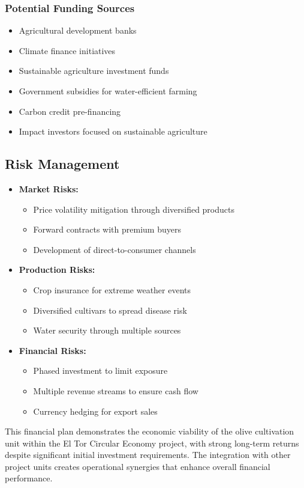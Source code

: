 \subsubsection{Potential Funding Sources}
\begin{itemize}
    \item Agricultural development banks
    \item Climate finance initiatives
    \item Sustainable agriculture investment funds
    \item Government subsidies for water-efficient farming
    \item Carbon credit pre-financing
    \item Impact investors focused on sustainable agriculture
\end{itemize}

\subsection{Risk Management}
\begin{itemize}
    \item \textbf{Market Risks:}
    \begin{itemize}
        \item Price volatility mitigation through diversified products
        \item Forward contracts with premium buyers
        \item Development of direct-to-consumer channels
    \end{itemize}
    
    \item \textbf{Production Risks:}
    \begin{itemize}
        \item Crop insurance for extreme weather events
        \item Diversified cultivars to spread disease risk
        \item Water security through multiple sources
    \end{itemize}
    
    \item \textbf{Financial Risks:}
    \begin{itemize}
        \item Phased investment to limit exposure
        \item Multiple revenue streams to ensure cash flow
        \item Currency hedging for export sales
    \end{itemize}
\end{itemize}

This financial plan demonstrates the economic viability of the olive cultivation unit within the El Tor Circular Economy project, with strong long-term returns despite significant initial investment requirements. The integration with other project units creates operational synergies that enhance overall financial performance.
